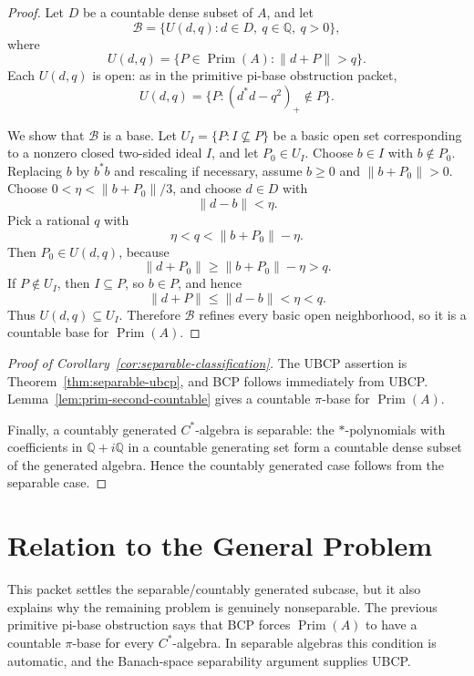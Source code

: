 \documentclass[11pt]{article}
\newcommand{\Prim}{\operatorname{Prim}}
\begin{document}
\begin{proof}
Let \(D\) be a countable dense subset of \(A\), and let
\[
        \mathcal B=
        \bigl\{
        U(d,q): d\in D,\ q\in\mathbb Q,\ q>0
        \bigr\},
\]
where
\[
        U(d,q)=\{P\in\Prim(A):\|d+P\|>q\}.
\]
Each \(U(d,q)\) is open: as in the primitive pi-base obstruction packet,
\[
        U(d,q)=\{P: (d^*d-q^2)_+\notin P\}.
\]

We show that \(\mathcal B\) is a base.  Let \(U_I=\{P:I\not\subseteq P\}\)
be a basic open set corresponding to a nonzero closed two-sided ideal \(I\),
and let \(P_0\in U_I\).  Choose \(b\in I\) with \(b\notin P_0\).  Replacing
\(b\) by \(b^*b\) and rescaling if necessary, assume \(b\ge0\) and
\(\|b+P_0\|>0\).  Choose \(0<\eta<\|b+P_0\|/3\), and choose \(d\in D\) with
\[
        \|d-b\|<\eta.
\]
Pick a rational \(q\) with
\[
        \eta<q<\|b+P_0\|-\eta.
\]
Then \(P_0\in U(d,q)\), because
\[
        \|d+P_0\|\ge \|b+P_0\|-\eta>q.
\]
If \(P\notin U_I\), then \(I\subseteq P\), so \(b\in P\), and hence
\[
        \|d+P\|\le \|d-b\|<\eta<q.
\]
Thus \(U(d,q)\subseteq U_I\).  Therefore \(\mathcal B\) refines every basic
open neighborhood, so it is a countable base for \(\Prim(A)\).
\end{proof}

\begin{proof}[Proof of Corollary~\ref{cor:separable-classification}]
The UBCP assertion is Theorem~\ref{thm:separable-ubcp}, and BCP follows
immediately from UBCP.  Lemma~\ref{lem:prim-second-countable} gives a
countable \(\pi\)-base for \(\Prim(A)\).

Finally, a countably generated \(C^*\)-algebra is separable: the
\(*\)-polynomials with coefficients in \(\mathbb Q+i\mathbb Q\) in a countable
generating set form a countable dense subset of the generated algebra.  Hence
the countably generated case follows from the separable case.
\end{proof}

\section*{Relation to the General Problem}

This packet settles the separable/countably generated subcase, but it also
explains why the remaining problem is genuinely nonseparable.  The previous
primitive pi-base obstruction says that BCP forces \(\Prim(A)\) to have a
countable \(\pi\)-base for every \(C^*\)-algebra.  In separable algebras this
condition is automatic, and the Banach-space separability argument supplies
UBCP.
\end{document}

